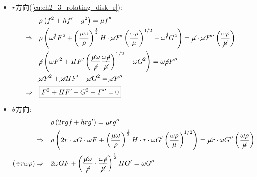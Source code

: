 \documentclass[../main.tex]{subfiles}
\begin{document}
\begin{itemize}
\begin{enumerate}
\begin{itemize}
\begin{align}
          \frac{\mu \omega}{\rho}\cdot \frac{\omega \rho}{\mu}
        \right)^{1/2} H' = 0 \nonumber\\
        \Rightarrow \quad & 2\omega F + \omega H' = 0 \nonumber\\
        \Rightarrow \quad & \boxed{2 F + H' = 0} \label{eq:ch2_3_rotating_disk_continuity_dimensionless}
      \end{align}
      \item $r$方向(\ref{eq:ch2_3_rotating_disk_r}):
      \begin{align}
        & \rho \left(
          f^2 + h f' - g^2
        \right) = \mu  f'' \nonumber\\
        \Rightarrow \quad & \rho \left(
          \omega^{\cancel{2}} F^2 + \left(
            \frac{\mu \omega}{\rho}
          \right)^{\frac{1}{2}} H \cdot \cancel{\omega} F' 
          \left(\frac{\omega \rho}{\mu}\right)^{1/2} - \omega^{\cancel{2}} G^2
        \right) = \cancel{\mu} \cdot \cancel{\omega} F'' \left(\frac{\omega \rho}{\cancel{\mu}}\right) \nonumber\\
        & \cancel{\rho} \left(
          \omega F^2 + H   F' \left(\frac{\cancel{\mu} \omega}{\cancel{\rho}}\frac{\omega \cancel{\rho}}{\cancel{\mu}}\right)^{1/2} - \omega G^2
        \right) = \omega\cancel{\rho} F'' \nonumber\\
        &\cancel{\omega} F^2 + \cancel{\omega} H F' -\cancel{\omega} G^2
        = \cancel{\omega} F'' \nonumber\\
        \Rightarrow \quad & \boxed{F^2 + H F' - G^2 - F'' = 0} \label{eq:ch2_3_rotating_disk_r_dimensionless}
      \end{align}
      \item $\theta$方向:
      \begin{align}
        & \rho \left(
          2 r g f + h r g'
        \right) = \mu r g'' \nonumber\\
        \Rightarrow \quad & \rho \left(
          2 r \cdot \omega G \cdot \omega F + \left(
            \frac{\mu \omega}{\rho}
          \right)^{\frac{1}{2}} H \cdot r \cdot \omega G' 
          \left(\frac{\omega \rho}{\mu}\right)^{1/2}
        \right) = \cancel{\mu} r \cdot \omega G'' \left(\frac{\omega \rho}{\cancel{\mu}}\right) \nonumber\\
        (\div r\omega\rho)\Rightarrow \quad & 
        2\omega GF +\left(
          \frac{\cancel{\mu}\omega}{\cancel{\rho}}\cdot \frac{\omega \cancel{\rho}}{\cancel{\mu}}
        \right)^{\frac{1}{2}} HG' = \omega G'' \nonumber\\

\end{align}
\end{itemize}
\end{enumerate}
\end{itemize}
\end{document}
